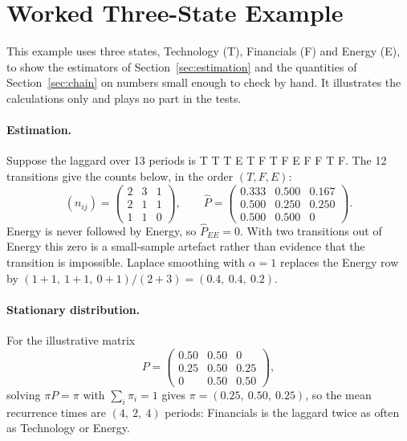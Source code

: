 \documentclass[11pt]{article}
\begin{document}
\clearpage
\section{Worked Three-State Example}
\label{app:toy}

This example uses three states, Technology (T), Financials (F) and Energy (E), to show the estimators of Section~\ref{sec:estimation} and the quantities of Section~\ref{sec:chain} on numbers small enough to check by hand. It illustrates the calculations only and plays no part in the tests.

\paragraph{Estimation.} Suppose the laggard over 13 periods is T T T E T F T F E F F T F. The 12 transitions give the counts below, in the order $(T, F, E)$:
\begin{equation*}
(n_{ij}) = \begin{pmatrix} 2 & 3 & 1 \\ 2 & 1 & 1 \\ 1 & 1 & 0 \end{pmatrix}, \qquad
\hat P = \begin{pmatrix} 0.333 & 0.500 & 0.167 \\ 0.500 & 0.250 & 0.250 \\ 0.500 & 0.500 & 0 \end{pmatrix}.
\end{equation*}
Energy is never followed by Energy, so $\hat P_{EE} = 0$. With two transitions out of Energy this zero is a small-sample artefact rather than evidence that the transition is impossible. Laplace smoothing with $\alpha = 1$ replaces the Energy row by $(1+1,\ 1+1,\ 0+1)/(2+3) = (0.4,\ 0.4,\ 0.2)$.

\paragraph{Stationary distribution.} For the illustrative matrix
\begin{equation*}
P = \begin{pmatrix} 0.50 & 0.50 & 0 \\ 0.25 & 0.50 & 0.25 \\ 0 & 0.50 & 0.50 \end{pmatrix},
\end{equation*}
solving $\pi P = \pi$ with $\sum_i \pi_i = 1$ gives $\pi = (0.25,\ 0.50,\ 0.25)$, so the mean recurrence times are $(4,\ 2,\ 4)$ periods: Financials is the laggard twice as often as Technology or Energy.
\end{document}
